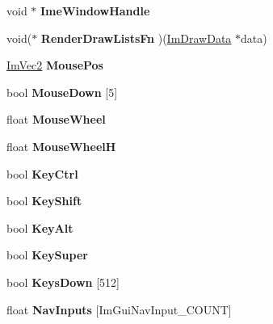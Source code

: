 \begin{DoxyCompactItemize}
\item 
\mbox{\label{structImGuiIO_a8baa252c4f76764eb866b920f227cfa2}} 
void $\ast$ {\bfseries Ime\+Window\+Handle}
\item 
\mbox{\label{structImGuiIO_ae16a9f25f36fe9706d8a33fb128e538a}} 
void($\ast$ {\bfseries Render\+Draw\+Lists\+Fn} )(\hyperlink{structImDrawData}{Im\+Draw\+Data} $\ast$data)
\item 
\mbox{\label{structImGuiIO_ad2e9e547cb4d2abe8e7d27407efffeb8}} 
\hyperlink{structImVec2}{Im\+Vec2} {\bfseries Mouse\+Pos}
\item 
\mbox{\label{structImGuiIO_a8f4613baafc93026175d9cdaf4e82d21}} 
bool {\bfseries Mouse\+Down} \mbox{[}5\mbox{]}
\item 
\mbox{\label{structImGuiIO_a21d3ca4928989a2c838b7b4ea95e5824}} 
float {\bfseries Mouse\+Wheel}
\item 
\mbox{\label{structImGuiIO_a25bed9de908b086e583854438ca7927d}} 
float {\bfseries Mouse\+WheelH}
\item 
\mbox{\label{structImGuiIO_a51de8f65dcabb80ef4e0d3c759ffcd7f}} 
bool {\bfseries Key\+Ctrl}
\item 
\mbox{\label{structImGuiIO_a3c7642214f88862af5b8467f98ac35c9}} 
bool {\bfseries Key\+Shift}
\item 
\mbox{\label{structImGuiIO_a1e64ef08a4448a2cac874496130992cb}} 
bool {\bfseries Key\+Alt}
\item 
\mbox{\label{structImGuiIO_afda9e11e21b7ba21573671c38d9f4a81}} 
bool {\bfseries Key\+Super}
\item 
\mbox{\label{structImGuiIO_a182f42d74cb25a4cf611cc0f776b3848}} 
bool {\bfseries Keys\+Down} \mbox{[}512\mbox{]}
\item 
\mbox{\label{structImGuiIO_a1e6e8142c2c2e09a715fa5efaa0db9fa}} 
float {\bfseries Nav\+Inputs} \mbox{[}Im\+Gui\+Nav\+Input\+\_\+\+C\+O\+U\+NT\mbox{]}

\end{DoxyCompactItemize}
